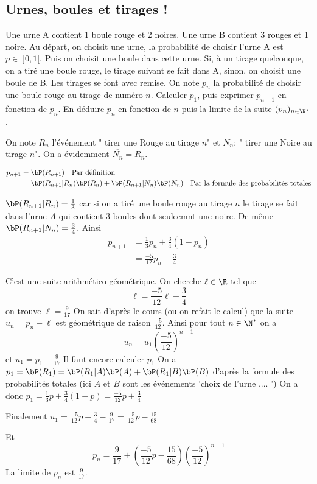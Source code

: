 \subsection{Urnes, boules et tirages ! }
\begin{exercice}   \;
Une urne A contient 1 boule rouge et 2 noires. Une urne B contient 3 rouges et 1 noire. Au d\'epart, on choisit une urne, la probabilit\'e de choisir l'urne A est $p\in \; \rbrack 0,1\lbrack$. Puis on choisit une boule dans cette urne. Si, \`a un tirage quelconque, on a tir\'e une boule rouge, le tirage suivant se fait dans A, sinon, on choisit une boule de B. Les tirages se font avec remise. On note $p_n$ la probabilit\'e de choisir une boule rouge au tirage de num\'ero $n$. Calculer $p_1$, puis exprimer $p_{n+1}$ en fonction de $p_n$. En d\'eduire $p_n$ en fonction de $n$ puis la limite de la suite $(p_n)_{n\in\N^{\star}}$.
\end{exercice}
\begin{correction}
On note $R_n$ l'événement " tirer une Rouge au tirage $n$" et $N_n$: " tirer une Noire au tirage $n$". On a évidemment $\overline{N_n} =R_n$. 

\begin{align*}
p_{n+1} &= \bP(R_{n+1} ) \quad \text{Par définition} \\
			&= \bP(R_{n+1}  | R_n ) \bP(R_n) +   \bP(R_{n+1}  | N_n ) \bP(N_n)  \quad \text{Par la formule des probabilités totales} 
\end{align*}

$\bP(R_{n+1}  | R_n ) =\frac{1}{3}$  car si on a tiré une boule rouge au tirage $n$ le tirage se fait dans l'urne $A$ qui contient 3 boules dont seuleemnt une noire. De même $\bP(R_{n+1}  | N_n ) =\frac{3}{4}$.
Ainsi
\begin{align*}
p_{n+1} &= \frac{1}{3}p_n + \frac{3}{4}(1-p_n)\\
			&= \frac{-5}{12} p_n + \frac{3}{4}
\end{align*}

C'est une suite arithmético géométrique. On cherche $\ell\in \R$ tel que 
$$\ell =  \frac{-5}{12} \ell+ \frac{3}{4}$$
on trouve $\ell = \frac{9}{17}$
On sait d'après le cours (ou  on refait le calcul) que la suite $u_n=p_n - \ell  $ est géométrique de raison $\frac{-5}{12}$. 
Ainsi pour tout $n\in \N^*$ on a 
$$u_n = u_1 \left(\frac{-5}{12} \right)^{n-1}$$
et $u_1 = p_1- \frac{9}{17} $
Il faut encore calculer $p_1$ 
On a $p_1= \bP(R_1) = \bP(R_1|A) \bP(A) +  \bP(R_1|B) \bP(B)$ d'après la formule des probabilités totales (ici $A$ et $B$ sont les événements 'choix de l'urne .... ') 
On a donc $p_1 = \frac{1}{3}p +\frac{3}{4}(1-p)= \frac{-5}{12} p + \frac{3}{4}$

Finalement $u_1= \frac{-5}{12} p + \frac{3}{4} - \frac{9}{17}=  \frac{-5}{12} p-\frac{15}{68}$

Et $$p_n = \frac{9}{17}  + \left(\frac{-5}{12} p-\frac{15}{68}\right) \left(\frac{-5}{12} \right)^{n-1}$$
La limite de $p_n$ est $\frac{9}{17}$.

\end{correction}